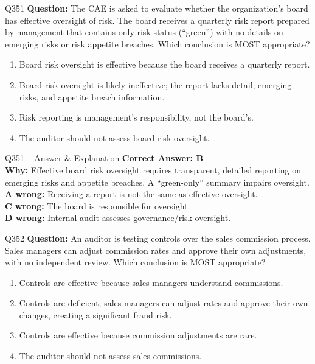 \documentclass[aspectratio=169,10pt]{beamer}
\begin{document}
	\begin{frame}[t]{Q351}
		\small
		\textbf{Question:} The CAE is asked to evaluate whether the organization's board has effective oversight of risk. The board receives a quarterly risk report prepared by management that contains only risk status (``green'') with no details on emerging risks or risk appetite breaches. Which conclusion is MOST appropriate?
		\begin{enumerate}[label=\Alph*.,itemsep=1pt,topsep=2pt]
			\item Board risk oversight is effective because the board receives a quarterly report.
			\item Board risk oversight is likely ineffective; the report lacks detail, emerging risks, and appetite breach information.
			\item Risk reporting is management's responsibility, not the board's.
			\item The auditor should not assess board risk oversight.
		\end{enumerate}
	\end{frame}
	
	\begin{frame}[t]{Q351 -- Answer \& Explanation}
		\small
		\textbf{Correct Answer: B} \\[4pt]
		\textbf{Why:} Effective board risk oversight requires transparent, detailed reporting on emerging risks and appetite breaches. A ``green-only'' summary impairs oversight. \\[4pt]
		\textbf{A wrong:} Receiving a report is not the same as effective oversight. \\[2pt]
		\textbf{C wrong:} The board is responsible for oversight. \\[2pt]
		\textbf{D wrong:} Internal audit assesses governance/risk oversight.
	\end{frame}
	
	\begin{frame}[t]{Q352}
		\small
		\textbf{Question:} An auditor is testing controls over the sales commission process. Sales managers can adjust commission rates and approve their own adjustments, with no independent review. Which conclusion is MOST appropriate?
		\begin{enumerate}[label=\Alph*.,itemsep=1pt,topsep=2pt]
			\item Controls are effective because sales managers understand commissions.
			\item Controls are deficient; sales managers can adjust rates and approve their own changes, creating a significant fraud risk.
			\item Controls are effective because commission adjustments are rare.
			\item The auditor should not assess sales commissions.
		\end{enumerate}
	\end{frame}
	
\end{document}
